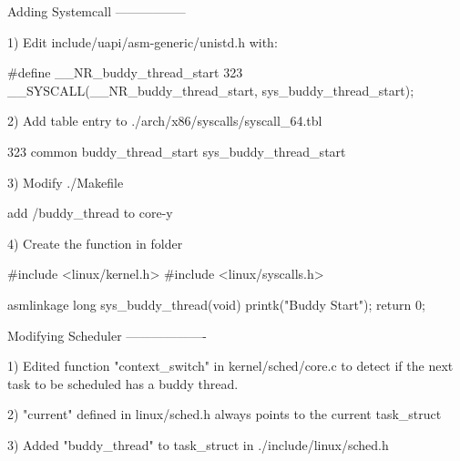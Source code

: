 Adding Systemcall
-----------------

1) Edit include/uapi/asm-generic/unistd.h with:

	#define __NR_buddy_thread_start 323                                                                                                                                                                      __SYSCALL(__NR_buddy_thread_start, sys_buddy_thread_start);

2) Add table entry to ./arch/x86/syscalls/syscall_64.tbl

	323 common  buddy_thread_start  sys_buddy_thread_start 

3) Modify ./Makefile

	add /buddy_thread to core-y

4) Create the function in folder

	#include <linux/kernel.h>                                                                                                                                                                                #include <linux/syscalls.h>
	 
	asmlinkage long sys_buddy_thread(void) {
	    printk("Buddy Start");
	    return 0;
	}




Modifying Scheduler
-------------------

1) Edited function "context_switch" in kernel/sched/core.c to detect if the next task
   to be scheduled has a buddy thread.

2) "current" defined in linux/sched.h always points to the current task_struct

3) Added "buddy_thread" to task_struct in ./include/linux/sched.h
